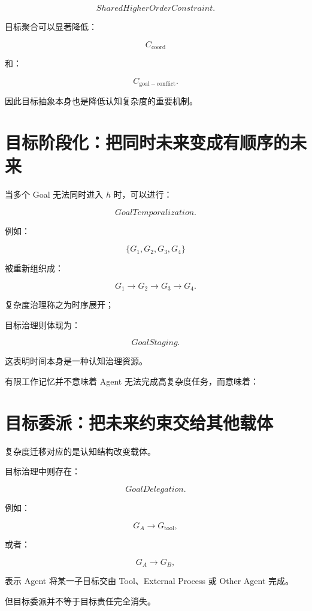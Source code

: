 \[
\boxed{
SharedHigherOrderConstraint.
}
\]

目标聚合可以显著降低：

\[
C_{\mathrm{coord}}
\]

和：

\[
C_{\mathrm{goal-conflict}}.
\]

因此目标抽象本身也是降低认知复杂度的重要机制。


\section{目标阶段化：把同时未来变成有顺序的未来}

当多个 Goal 无法同时进入 $h$ 时，可以进行：

\[
\boxed{
GoalTemporalization.
}
\]

例如：

\[
\{G_1,G_2,G_3,G_4\}
\]

被重新组织成：

\[
G_1
\rightarrow
G_2
\rightarrow
G_3
\rightarrow
G_4.
\]

复杂度治理称之为时序展开；

目标治理则体现为：

\[
\boxed{
GoalStaging.
}
\]

这表明时间本身是一种认知治理资源。

有限工作记忆并不意味着 Agent 无法完成高复杂度任务，而意味着：

\begin{statementbox}
\centering
{}
\end{statementbox}


\section{目标委派：把未来约束交给其他载体}

复杂度迁移对应的是认知结构改变载体。

目标治理中则存在：

\[
\boxed{
GoalDelegation.
}
\]

例如：

\[
G_A
\rightarrow
G_{\mathrm{tool}},
\]

或者：

\[
G_A
\rightarrow
G_B,
\]

表示 Agent 将某一子目标交由 Tool、External Process 或 Other Agent 完成。

但目标委派并不等于目标责任完全消失。

